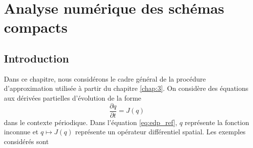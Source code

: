 \chapter{Analyse numérique des schémas compacts}
\label{chap:2}

\section{Introduction}

Dans ce chapitre, nous considérons le cadre général de la procédure d'approximation utilisée à partir du chapitre \ref{chap:3}. On considère des équations aux dérivées partielles d'évolution de la forme
\begin{equation}
\dfrac{\partial q}{\partial t} = J(q)
\label{eq:edp_ref}
\end{equation}
dans le contexte périodique. Dans l'équation \eqref{eq:edp_ref}, $q$ représente la fonction inconnue et $q \mapsto J(q)$ représente un opérateur différentiel spatial. Les exemples considérés sont
